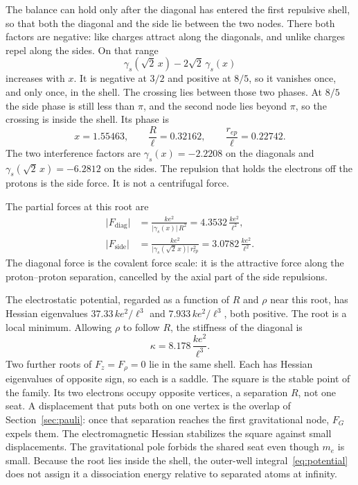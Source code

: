 \documentclass[a4paper]{article}
\begin{document}
The balance can hold only after the diagonal has entered the first repulsive shell, so that both the diagonal and the side lie between the two nodes. There both factors are negative: like charges attract along the diagonals, and unlike charges repel along the sides. On that range
\[
\gamma_s(\sqrt{2}\,x)-2\sqrt{2}\,\gamma_s(x)
\]
increases with \(x\). It is negative at \(3/2\) and positive at \(8/5\), so it vanishes once, and only once, in the shell. The crossing lies between those two phases. At \(8/5\) the side phase is still less than \(\pi\), and the second node lies beyond \(\pi\), so the crossing is inside the shell. Its phase is
\[
x=1.55463,
\qquad
\frac{R}{\ell}=0.32162,
\qquad
\frac{r_{ep}}{\ell}=0.22742.
\]
The two interference factors are \(\gamma_s(x)=-2.2208\) on the diagonals and \(\gamma_s(\sqrt{2}\,x)=-6.2812\) on the sides. The repulsion that holds the electrons off the protons is the side force. It is not a centrifugal force.

The partial forces at this root are
\begin{align}
\bigl|F_{\mathrm{diag}}\bigr|
  &=\frac{k e^{2}}{\bigl|\gamma_s(x)\bigr|\,R^{2}}
  =4.3532\,\frac{k e^{2}}{\ell^{2}},
\label{eq:Fdiag}\\
\bigl|F_{\mathrm{side}}\bigr|
  &=\frac{k e^{2}}{\bigl|\gamma_s(\sqrt{2}\,x)\bigr|\,r_{ep}^{2}}
  =3.0782\,\frac{k e^{2}}{\ell^{2}}.
\label{eq:Fside}
\end{align}
The diagonal force is the covalent force scale: it is the attractive force along the proton--proton separation, cancelled by the axial part of the side repulsions.

The electrostatic potential, regarded as a function of \(R\) and \(\rho\) near this root, has Hessian eigenvalues \(37.33\,k e^{2}/\ell^{3}\) and \(7.933\,k e^{2}/\ell^{3}\), both positive. The root is a local minimum. Allowing \(\rho\) to follow \(R\), the stiffness of the diagonal is
\begin{equation}
\label{eq:kappa}
\kappa=8.178\,\frac{k e^{2}}{\ell^{3}}.
\end{equation}
Two further roots of \(F_z=F_{\rho}=0\) lie in the same shell. Each has Hessian eigenvalues of opposite sign, so each is a saddle. The square is the stable point of the family. Its two electrons occupy opposite vertices, a separation \(R\), not one seat. A displacement that puts both on one vertex is the overlap of Section~\ref{sec:pauli}: once that separation reaches the first gravitational node, \(F_G\) expels them. The electromagnetic Hessian stabilizes the square against small displacements. The gravitational pole forbids the shared seat even though \(m_e\) is small. Because the root lies inside the shell, the outer-well integral~\eqref{eq:potential} does not assign it a dissociation energy relative to separated atoms at infinity.
\end{document}
